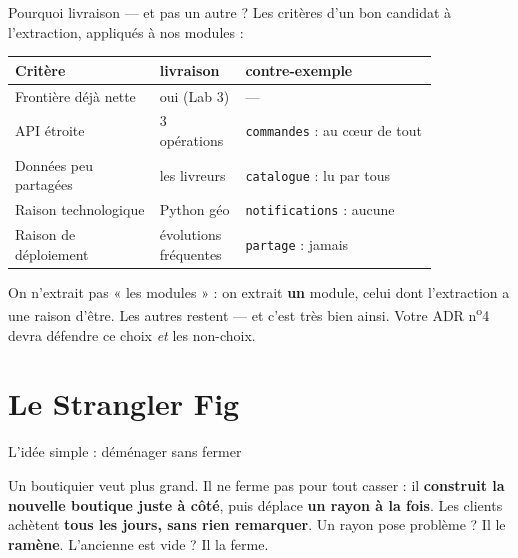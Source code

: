 \documentclass[aspectratio=169,11pt]{beamer}
\begin{document}
\begin{frame}{Pourquoi livraison — et pas un autre ?}
{\small Les critères d'un bon candidat à l'extraction, appliqués à nos modules :}
\vskip2pt
{\small\begin{tabular}{p{0.30\linewidth}p{0.14\linewidth}p{0.40\linewidth}}
\toprule
\textbf{Critère} & \textbf{livraison} & \textbf{contre-exemple}\\
\midrule
Frontière déjà nette & oui (Lab 3) & —\\
API étroite & 3 opérations & \texttt{commandes} : au c\oe ur de tout\\
Données peu partagées & les livreurs & \texttt{catalogue} : lu par tous\\
Raison technologique & Python géo & \texttt{notifications} : aucune\\
Raison de déploiement & évolutions fréquentes & \texttt{partage} : jamais\\
\bottomrule
\end{tabular}}
\vskip4pt
\begin{ucadret}[À retenir]
{\small On n'extrait pas « les modules » : on extrait \textbf{un} module, celui dont l'extraction a une raison d'être. Les autres restent — et c'est très bien ainsi. Votre ADR n\textsuperscript{o}4 devra défendre ce choix \emph{et} les non-choix.}
\end{ucadret}
\end{frame}

\section{Le Strangler Fig}

\begin{frame}{L'idée simple : déménager sans fermer}
\begin{ucadex}
{\small Un boutiquier veut plus grand. Il ne ferme pas pour tout casser :
il \textbf{construit la nouvelle boutique juste à côté}, puis déplace
\textbf{un rayon à la fois}. Les clients achètent \textbf{tous les jours,
sans rien remarquer}. Un rayon pose problème ? Il le \textbf{ramène}.
L'ancienne est vide ? Il la ferme.}
\end{ucadex}
\end{frame}
\end{document}
